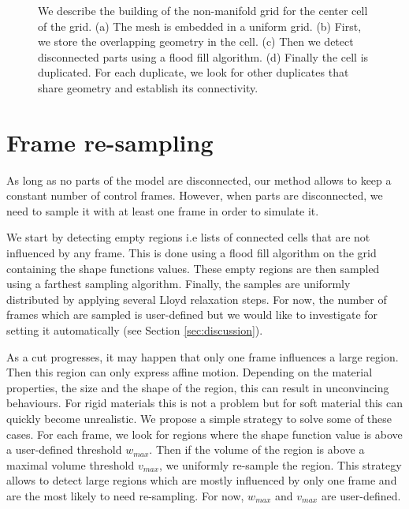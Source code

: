\documentclass[11pt, oneside, a4paper]{memoir}
\begin{document}
\begin{figure}[!ht]
\begin{subfigure}[b]{0.20\linewidth}
\caption{\label{fig:buildNMG4}}
\end{subfigure}
\caption{\label{fig:nonmanifoldgridbuilding}
We describe the building of the non-manifold grid for the center cell of the grid. (a) The mesh is embedded in a uniform grid. (b) First, we store the overlapping geometry in the cell. (c) Then we detect disconnected parts using a flood fill algorithm. (d) Finally the cell is duplicated. For each duplicate, we look for other duplicates that share geometry and establish its connectivity.}
\end{figure}


\section{Frame re-sampling} \label{sec:resampling}
As long as no parts of the model are disconnected, our method allows to keep a constant number of control frames. However, when parts are disconnected, we need to sample it with at least one frame in order to simulate it. 

We start by detecting empty regions i.e lists of connected cells that are not influenced by any frame. This is done using a flood fill algorithm on the grid containing the shape functions values. These empty regions are then sampled using a farthest sampling algorithm. Finally, the samples are uniformly distributed by applying several Lloyd relaxation steps. For now, the number of frames which are sampled is user-defined but we would like to investigate for setting it automatically (see Section \ref{sec:discussion}). 

As a cut progresses, it may happen that only one frame influences a large region. Then this region can only express affine motion. Depending on the material properties, the size and the shape of the region, this can result in unconvincing behaviours. For rigid materials this is not a problem but for soft material this can quickly become unrealistic. We propose a simple strategy to solve some of these cases. For each frame, we look for regions where the shape function value is above a user-defined threshold $w_{max}$. Then if the volume of the region is above a maximal volume threshold $v_{max}$, we uniformly re-sample the region. This strategy allows to detect large regions which are mostly influenced by only one frame and are the most likely to need re-sampling. For now, $w_{max}$ and $v_{max}$ are user-defined.
\end{document}
